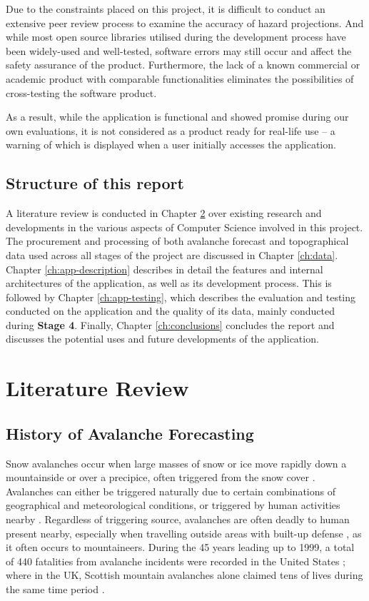 \documentclass[openany]{UoYCSproject}
\begin{document}
Due to the constraints placed on this project, it is difficult to conduct an extensive peer review process to examine the accuracy of hazard projections. And while most open source libraries utilised during the development process have been widely-used and well-tested, software errors may still occur and affect the safety assurance of the product. Furthermore, the lack of a known commercial or academic product with comparable functionalities eliminates the possibilities of cross-testing the software product.

As a result, while the application is functional and showed promise during our own evaluations, it is not considered as a product ready for real-life use -- a warning of which is displayed when a user initially accesses the application.

\section{Structure of this report}

A literature review is conducted in Chapter \ref{ch:lit-review} over existing research and developments in the various aspects of Computer Science involved in this project. The procurement and processing of both avalanche forecast and topographical data used across all stages of the project are discussed in Chapter \ref{ch:data}. Chapter \ref{ch:app-description} describes in detail the features and internal architectures of the application, as well as its development process. This is followed by Chapter \ref{ch:app-testing}, which describes the evaluation and testing conducted on the application and the quality of its data, mainly conducted during \textbf{Stage 4}. Finally, Chapter \ref{ch:conclusions} concludes the report and discusses the potential uses and future developments of the application.

\chapter{Literature Review} \label{ch:lit-review}

\section{History of Avalanche Forecasting}

Snow avalanches occur when large masses of snow or ice move rapidly down a mountainside or over a precipice, often triggered from the snow cover \cite[p. 1]{91097820150101}. Avalanches can either be triggered naturally due to certain combinations of geographical \cite[p. 17]{91097820150101} and meteorological \cite[p. 23]{91097820150101} conditions, or triggered by human activities nearby \cite{schweizer2001characteristics}. Regardless of triggering source, avalanches are often deadly to human present nearby, especially when travelling outside areas with built-up defense \cite{91097820150101}, as it often occurs to mountaineers. During the 45 years leading up to 1999, a total of 440 fatalities from avalanche incidents were recorded in the United States \cite{PAGE1999146}; where in the UK, Scottish mountain avalanches alone claimed tens of lives during the same time period \cite{scottish-avalanches}.
\end{document}
